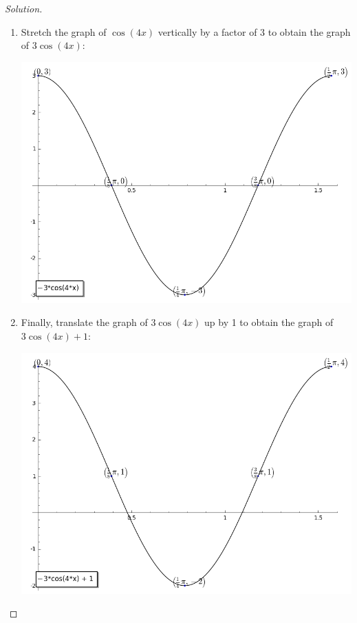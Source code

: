 \documentclass[12pt]{amsart}
\begin{document}
\begin{thm}[20 Points]
\begin{proof}[Solution]
\begin{enumerate}
\begin{center}
      \end{center}
    \item
      Stretch the graph of $\cos(4x)$ vertically by a factor of 3 to obtain the graph of $3\cos(4x)$:
      \begin{center}
        \includegraphics[scale=0.5]{cos/p_2}
      \end{center}
    \item
      Finally, translate the graph of $3\cos(4x)$ up by 1 to obtain the graph of $3\cos(4x) + 1$:
      \begin{center}
        \includegraphics[scale=0.5]{cos/p_3}
      \end{center}
    \end{enumerate}
  \end{proof}
\end{thm}
\end{document}
